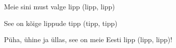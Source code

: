 Meie sini must valge lipp (lipp, lipp)

See on k\~oige lippude tipp (tipp, tipp)

P\"uha, \"uhine ja \"ullas, see on meie Eesti lipp (lipp, lipp)!